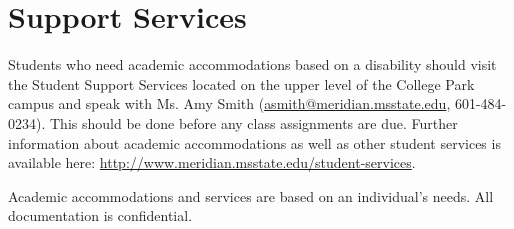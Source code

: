 \section{Support Services}

Students who need academic accommodations based on a disability should visit the Student Support Services located on the upper level of the College Park campus and speak with Ms. Amy Smith (\url{asmith@meridian.msstate.edu}, 601-484-0234). This should be done before any class assignments are due. Further information about academic accommodations as well as other student services is available here: \url{http://www.meridian.msstate.edu/student-services}.

Academic accommodations and services are based on an individual’s needs.  All documentation is confidential. 

